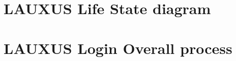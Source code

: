 \documentclass[../main.tex]{subfiles}
\begin{document}
\section{LAUXUS Life State diagram}
    \label{appendix:lauxus_life_state_diagram}
    
\section{LAUXUS Login Overall process}
    \label{appendix:lauxus_login_global_process}
    
\end{document}
